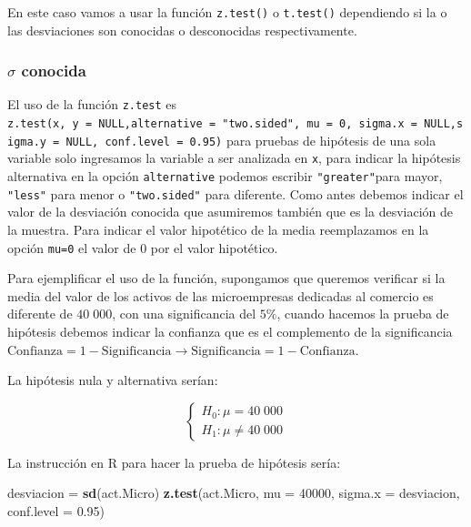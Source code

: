 \documentclass[letterpaper,]{book}
\newenvironment{Shaded}{\begin{snugshade}}{\end{snugshade}}
\newcommand{\DataTypeTok}[1]{\textcolor[rgb]{0.13,0.29,0.53}{#1}}
\newcommand{\DecValTok}[1]{\textcolor[rgb]{0.00,0.00,0.81}{#1}}
\newcommand{\FloatTok}[1]{\textcolor[rgb]{0.00,0.00,0.81}{#1}}
\newcommand{\KeywordTok}[1]{\textcolor[rgb]{0.13,0.29,0.53}{\textbf{#1}}}
\newcommand{\NormalTok}[1]{#1}
\newcommand{\StringTok}[1]{\textcolor[rgb]{0.31,0.60,0.02}{#1}}
\begin{document}
En este caso vamos a usar la función \texttt{z.test()} o \texttt{t.test()} dependiendo si la o las desviaciones son conocidas o desconocidas respectivamente.

\hypertarget{sigma-conocida}{%
\subsubsection{\texorpdfstring{\(\sigma\) conocida}{\textbackslash{}sigma conocida}}\label{sigma-conocida}}

El uso de la función \texttt{z.test} es \texttt{z.test(x,\ y\ =\ NULL,alternative\ =\ "two.sided",\ mu\ =\ 0,\ sigma.x\ =\ NULL,sigma.y\ =\ NULL,\ conf.level\ =\ 0.95)} para pruebas de hipótesis de una sola variable solo ingresamos la variable a ser analizada en \texttt{x}, para indicar la hipótesis alternativa en la opción \texttt{alternative} podemos escribir \texttt{"greater"}para mayor, \texttt{"less"} para menor o \texttt{"two.sided"} para diferente. Como antes debemos indicar el valor de la desviación conocida que asumiremos también que es la desviación de la muestra.
Para indicar el valor hipotético de la media reemplazamos en la opción \texttt{mu=0} el valor de \(0\) por el valor hipotético.

Para ejemplificar el uso de la función, supongamos que queremos verificar si la media del valor de los activos de las microempresas dedicadas al comercio es diferente de \(40\;000\), con una significancia del \(5\%\), cuando hacemos la prueba de hipótesis debemos indicar la confianza que es el complemento de la significancia \(\text{Confianza}=1- \text{Significancia} \rightarrow \text{Significancia}=1-\text{Confianza}\).

La hipótesis nula y alternativa serían:

\begin{equation} 
\begin{cases} 
H_0: \mu = 40\;000 \\ 
H_1: \mu \neq 40\;000
\end{cases} 
\end{equation}

La instrucción en R para hacer la prueba de hipótesis sería:

\begin{Shaded}
\begin{Highlighting}[]
\NormalTok{desviacion =}\StringTok{ }\KeywordTok{sd}\NormalTok{(act.Micro)}
\KeywordTok{z.test}\NormalTok{(act.Micro, }\DataTypeTok{mu =} \DecValTok{40000}\NormalTok{, }\DataTypeTok{sigma.x =}\NormalTok{ desviacion, }\DataTypeTok{conf.level =} \FloatTok{0.95}\NormalTok{)}
\end{Highlighting}
\end{Shaded}
\end{document}
